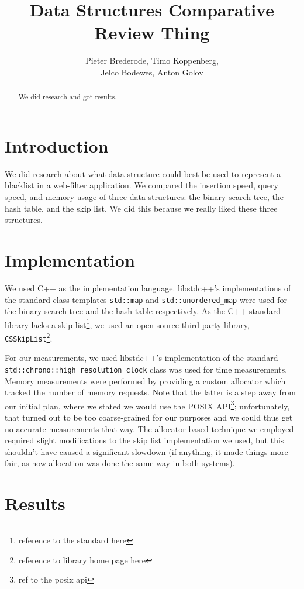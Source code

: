 \documentclass[12pt,a4paper]{article}
\title{Data Structures Comparative Review Thing}
\author{Pieter Brederode, Timo Koppenberg, \\ Jelco Bodewes, Anton Golov}
\begin{document}
    \maketitle

    \begin{abstract}
        We did research and got results.
    \end{abstract}


    \section{Introduction}
    
    We did research about what data structure could best be used to represent a blacklist in a 
    web-filter application.  We compared the insertion speed, query speed, and memory usage of three
    data structures: the binary search tree, the hash table, and the skip list.  We did this because
    we really liked these three structures. 

	\section{Implementation}
	
	We used C++ as the implementation language.  libstdc++'s implementations of the standard
	class templates \texttt{std::map} and \texttt{std::unordered\_map} were used for the binary search
	tree and the hash table respectively.  As the C++ standard library lacks a skip list\footnote{reference to
	the standard here}, we used an open-source third party library, \texttt{CSSkipList}\footnote{reference to
	library home page here}.
	
	For our measurements, we used libstdc++'s implementation of the standard
	\texttt{std::chrono::high\_resolution\_clock} class was used for time measurements.   Memory
	measurements were performed by providing a custom allocator which tracked the number of memory
	requests.  Note that the latter is a step away from our initial plan, where we stated we would use
	the POSIX API\footnote{ref to the posix api}; unfortunately, that turned out to be too coarse-grained
	for our purposes and we could thus get no accurate measurements that way.  The allocator-based technique
	we employed required slight modifications to the skip list implementation we used, but this
	shouldn't have caused a significant slowdown (if anything, it made things more fair, as now allocation
	was done the same way in both systems).
	

    \section{Results}
\end{document}
